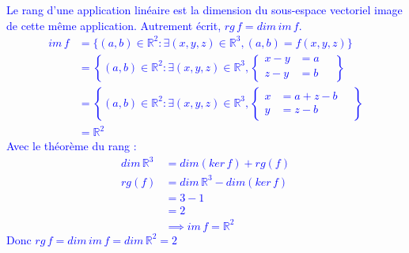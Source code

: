 \documentclass[a4paper,12pt]{article}
\def\R{\mathbb{R}}
\newcommand{\add}[1]{\textcolor{blue}{#1}}
\begin{document}
\begin{exercice}
\begin{enumerate}
            \add{
                Le rang d'une application linéaire est la dimension du sous-espace vectoriel image de cette même application. Autrement écrit, $rg\,f = dim\,im\,f$.
                \begin{align*}
                    im\,f &= \{(a,b) \in \R^2 : \exists (x,y,z) \in \R^3, (a,b) = f(x,y,z)\}\\
                          &= \left\{(a,b) \in \R^2 : \exists (x,y,z) \in \R^3,
                           \left\{
                               \begin{aligned}
                                   x-y&=a\\
                                   z-y&=b
                               \end{aligned}
                           \right.
                           \quad
                          \right\}\\
                          &= \left\{(a,b) \in \R^2 : \exists (x,y,z) \in \R^3,
                           \left\{
                               \begin{aligned}
                                   x&=a+z-b\\
                                   y&=z-b
                               \end{aligned}
                           \right.
                           \quad
                          \right\}\\
                         &=\R^2
                \end{align*}
                Avec le théorème du rang :
                \begin{align*}
                    dim\,\R^3 &= dim(ker\,f) + rg(f)\\
                    rg(f)&=dim\,\R^3-dim(ker\,f)\\
                    &=3-1\\
                    &=2\\
                    &\implies im\,f=\R^2
                \end{align*}
                Donc $rg\,f=dim\,im\,f=dim\,\R^2=2$
            }

    \end{enumerate}
\end{exercice}

\bigskip
\end{document}
